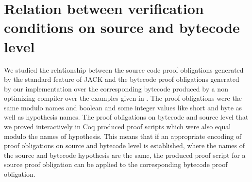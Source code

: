 
 \section{Relation between verification conditions on source and bytecode level }  \label{pogEquiv}

 We studied the relationship between the source code proof obligations generated 
 by the standard feature of JACK and the bytecode proof obligations generated by our implementation over the corresponding bytecode
 produced by a non optimizing compiler over the examples given in \cite{JPVC03JKM}. The proof obligations were the same modulo names and
 boolean and some integer values like short and byte as well as hypothesis names. 
The proof obligations on bytecode and source level
that we proved interactively in Coq produced proof scripts which were also equal modulo the names of hypothesis. This means that if an appropriate encoding of proof obligations on source and bytecode level is established, where the names of the source and bytecode hypothesis are the same, the produced proof script for a source proof obligation can be applied to the corresponding bytecode proof obligation. 



 


